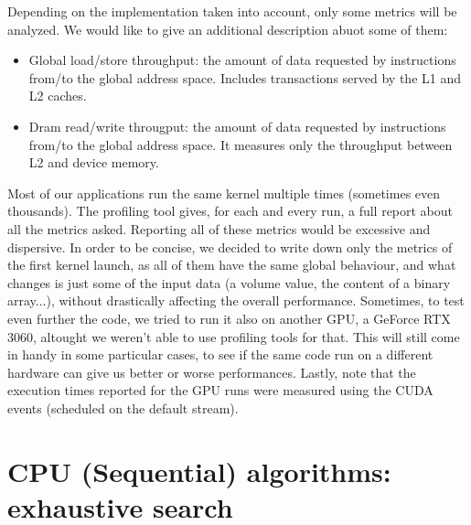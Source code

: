 \documentclass[12pt]{extarticle}
\begin{document}
Depending on the implementation taken into account, only some metrics will be analyzed. We would like to give an additional description abuot some of them:
\begin{itemize}
    \item Global load/store throughput: the amount of data requested by instructions from/to the global address space. Includes transactions served by the L1 and L2 caches.
    \item Dram read/write througput: the amount of data requested by instructions from/to the global address space. It measures only the throughput between L2 and device memory.
\end{itemize}
Most of our applications run the same kernel multiple times (sometimes even thousands). The profiling tool gives, for each and every run, a full report about all the metrics asked. Reporting all of these metrics would be excessive and dispersive. In order to be concise, we decided to write down only the metrics of the first kernel launch, as all of them have the same global behaviour, and what changes is just some of the input data (a volume value, the content of a binary array...), without drastically affecting the overall performance.\newline
Sometimes, to test even further the code, we tried to run it also on another GPU, a GeForce RTX 3060, altought we weren't able to use profiling tools for that. This will still come in handy in some particular cases, to see if the same code run on a different hardware can give us better or worse performances.\newline
Lastly, note that the execution times reported for the GPU runs were measured using the CUDA events (scheduled on the default stream).

\section{CPU (Sequential) algorithms: exhaustive search}
\end{document}
